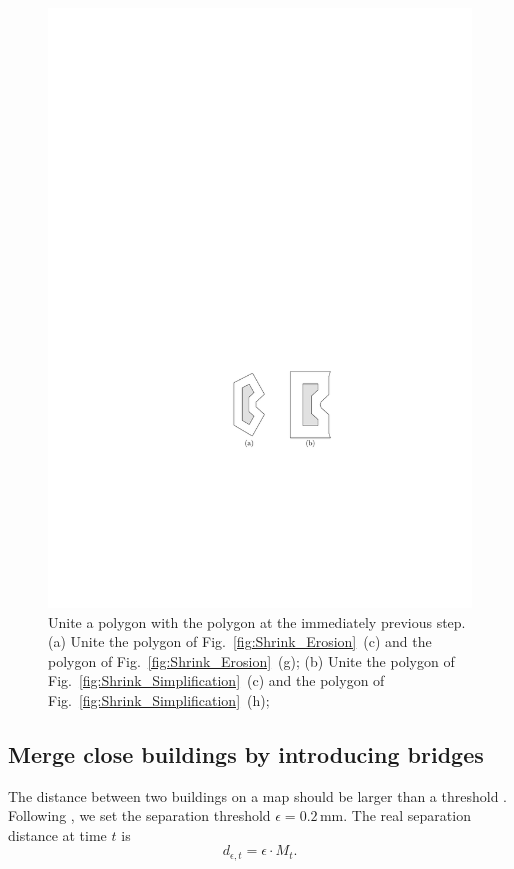 \documentclass[graybox]{svmult}
\newcommand{\fig}{Fig.~}
\begin{document}
\begin{figure}[tb]
	\centering
	\includegraphics[]{Shrink_Uniting}
	\caption{Unite a polygon with the polygon at the immediately previous step.
		(a) Unite the polygon of \fig\ref{fig:Shrink_Erosion}~(c) and the 
		polygon of \fig\ref{fig:Shrink_Erosion}~(g);
		(b) Unite the polygon of \fig\ref{fig:Shrink_Simplification}~(c) and 
		the polygon of \fig\ref{fig:Shrink_Simplification}~(h);
	}
	\label{fig:Shrink_Uniting}
\end{figure}




\subsection{Merge close buildings by introducing bridges}
The distance between two buildings on a map should be larger than a threshold
\parencite{Regnauld2001,Li2004}.
Following \textcite{Basaraner2008,Stoter2009}, 
we set the separation threshold $\epsilon= 0.2\,\mathrm{mm}$. 
The real separation distance at time $t$ is
\begin{equation}
	\label{eq:d_epsilont}
	d_{\epsilon, t} = \epsilon \cdot M_t.
\end{equation}
\end{document}
